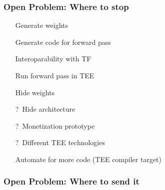 \documentclass[aspectratio=169,nototalframenumber]{beamer}
\newcommand{\done}{\textcolor{uibkblue}{\ding{52}}}
\newcommand{\unsure}{\textcolor{uibkorange}{?\,}}
\newcommand{\excluded}{\textcolor{red!88!black}{\ding{56}}}
\begin{document}
\begin{frame}
    \frametitle{Open Problem: Where to stop}

	\begin{itemize}
    	\item[\done] Generate weights
    	\item[\done] Generate code for forward pass
    	\item[\done] Interoparability with TF
    	\item[\done] Run forward pass in TEE
    	\item[\done] Hide weights
    	\item[\unsure] Hide architecture
    	\item[\unsure] Monetization prototype
    	\item[\unsure] Different TEE technologies
    	\item[\excluded] Automate for more code (TEE compiler target)
	\end{itemize}
\end{frame}

\begin{frame}
    \frametitle{Open Problem: Where to send it}
\end{frame}

\end{document}
